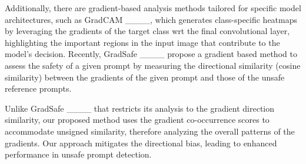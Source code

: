 Additionally, there are gradient-based analysis methods tailored for specific model architectures, such as GradCAM ____, which generates class-specific heatmaps by leveraging the gradients of the target class wrt the final convolutional layer, highlighting the important regions in the input image that contribute to the model's decision.  Recently, GradSafe ____ propose a gradient based method to assess the safety of a given prompt by measuring the directional similarity (cosine similarity) between the gradients of the given prompt and those of the unsafe reference prompts.

Unlike GradSafe ____ that restricts its analysis to the gradient direction similarity, our proposed method uses the gradient co-occurrence scores to accommodate unsigned similarity, therefore analyzing the overall patterns of the gradients. Our approach mitigates the directional bias, leading to enhanced performance in unsafe prompt detection.